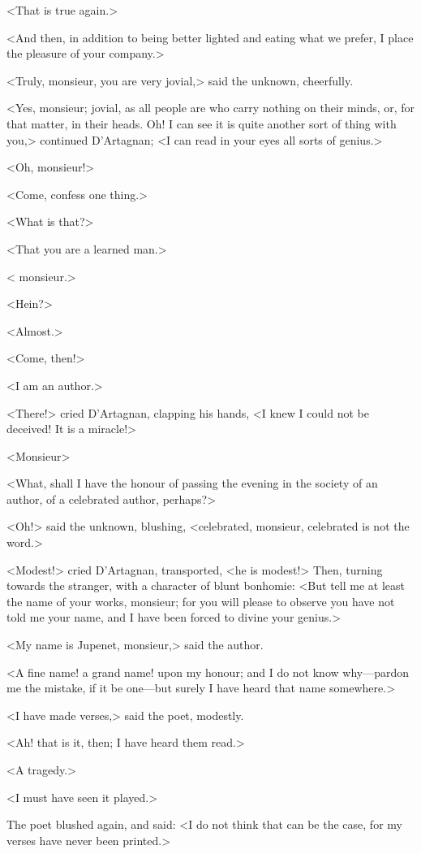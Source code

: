 <That is true again.>

<And then, in addition to being better lighted and eating what we prefer, I place the pleasure of your company.>

<Truly, monsieur, you are very jovial,> said the unknown, cheerfully.

<Yes, monsieur; jovial, as all people are who carry nothing on their minds, or, for that matter, in their heads. Oh! I can see it is quite another sort of thing with you,> continued D'Artagnan; <I can read in your eyes all sorts of genius.>

<Oh, monsieur!>

<Come, confess one thing.>

<What is that?>

<That you are a learned man.>

< monsieur.>

<Hein?>

<Almost.>

<Come, then!>

<I am an author.>

<There!> cried D'Artagnan, clapping his hands, <I knew I could not be deceived! It is a miracle!>

<Monsieur\longdash>

<What, shall I have the honour of passing the evening in the society of an author, of a celebrated author, perhaps?>

<Oh!> said the unknown, blushing, <celebrated, monsieur, celebrated is not the word.>

<Modest!> cried D'Artagnan, transported, <he is modest!> Then, turning towards the stranger, with a character of blunt bonhomie: <But tell me at least the name of your works, monsieur; for you will please to observe you have not told me your name, and I have been forced to divine your genius.>

<My name is Jupenet, monsieur,> said the author.

<A fine name! a grand name! upon my honour; and I do not know why—pardon me the mistake, if it be one—but surely I have heard that name somewhere.>

<I have made verses,> said the poet, modestly.

<Ah! that is it, then; I have heard them read.>

<A tragedy.>

<I must have seen it played.>

The poet blushed again, and said: <I do not think that can be the case, for my verses have never been printed.>


